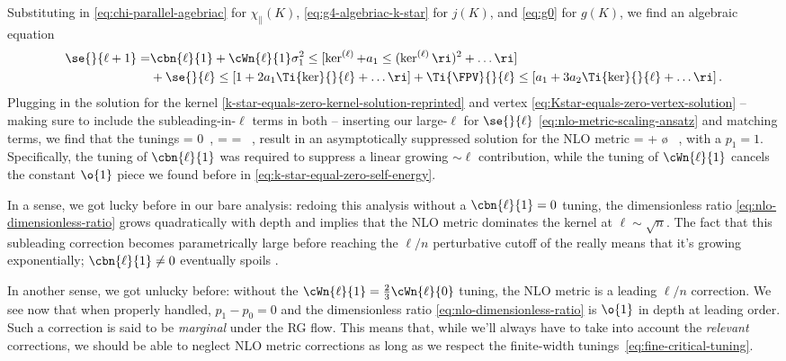 Substituting in \eqref{eq:chi-parallel-agebriac} for $\chi_{\parallel}(K)$, \eqref{eq:g4-algebriac-k-star} for $j(K)$, and \eqref{eq:g0} for $g(K)$, we find an algebraic equation
\begin{align}
\se{}{\ell+1}= &\cbn{\ell}{1} + \cWn{\ell}{1} \sigma_1^2\le[\ker^{(\ell)}+a_1 \le(\ker^{(\ell)}\ri)^2+\ldots\ri] \\
&+\se{}{\ell}\le[1+2a_1 \Ti{\ker}{}{\ell}+\ldots\ri] +\Ti{\FPV}{}{\ell}\le[a_1+3a_2  \Ti{\ker}{}{\ell}+\ldots\ri] \, . \notag 
\end{align}
Plugging in the solution for the kernel \eqref{k-star-equals-zero-kernel-solution-reprinted} and vertex \eqref{eq:Kstar-equals-zero-vertex-solution} -- making sure to include the subleading-in-$\ell$ terms in both -- inserting our large-$\ell$  for $\se{}{\ell}$ \eqref{eq:nlo-metric-scaling-ansatz} and matching terms, we find that the tunings
\be\label{eq:fine-critical-tuning}
 = 0\, , \qquad {} =  =  \, ,
\ee
result in an asymptotically suppressed solution for the NLO metric
\be\label{eq:nlo-metric-subleading}
\se{}{\ell}= \le[ \frac{3 a_2 - a_1^2 }{ (-a_1)^3} \ri] + \o{ } \, ,
\ee 
with a  $p_1=1$.
Specifically, the tuning of $\cbn{\ell}{1}$ was required to suppress a linear growing $\sim \ell$ contribution, while the tuning of $\cWn{\ell}{1}$ cancels the constant $\o{1}$ piece we found before in \eqref{eq:k-star-equal-zero-self-energy}. 
\bi
\item In a sense, we got lucky before in our bare analysis: redoing this analysis without a $\cbn{\ell}{1}=0$ tuning, 
the dimensionless ratio \eqref{eq:nlo-dimensionless-ratio} grows quadratically with depth and
implies that the NLO metric dominates the kernel at $\ell \sim \sqrt{n}$.
The fact that this subleading correction becomes parametrically large before reaching the $\ell/n$ perturbative cutoff of the  really means that it's growing exponentially; $\cbn{\ell}{1}\neq0$ eventually spoils .
\item In another sense, we got unlucky before: without the $\cWn{\ell}{1} = \frac{2}{3}\cWn{\ell}{0}$ tuning, the NLO metric is a leading $\ell/n$ correction. We see now that when properly handled, $p_1 - p_0 = 0$ and the dimensionless ratio \eqref{eq:nlo-dimensionless-ratio} is $\o{1}$ in depth at leading order. Such a correction is said to be \emph{marginal} under the RG flow. 
This means that, while we'll always have to take into account the \emph{relevant}  corrections, we should be able to neglect NLO metric corrections as long as we respect the finite-width tunings~\eqref{eq:fine-critical-tuning}.
\ei

